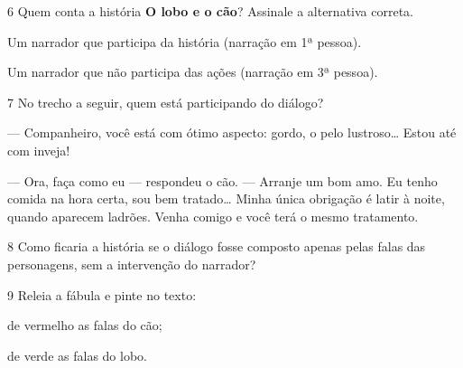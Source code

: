 \begin{conteudo}
\begin{conteudo}
\begin{conteudo}
\begin{conteudo}

\pagebreak
\num{6} Quem conta a história \textbf{O lobo e o cão}? Assinale a alternativa correta.

\begin{boxlist}
 Um narrador que participa da história (narração em 1ª pessoa).

 Um narrador que não participa das ações (narração em 3ª pessoa).
\end{boxlist}

\num{7} No trecho a seguir, quem está participando do diálogo?

\begin{conteudo}{
--- Companheiro, você está com ótimo aspecto: gordo, o pelo
lustroso\ldots{} Estou até com inveja!

--- Ora, faça como eu --- respondeu o cão. --- Arranje um bom amo. Eu
tenho comida na hora certa, sou bem tratado\ldots{} Minha única
obrigação é latir à noite, quando aparecem ladrões. Venha comigo e você
terá o mesmo tratamento.
}


\num{8} Como ficaria a história se o diálogo fosse composto apenas pelas falas
das personagens, sem a intervenção do narrador?




\num{9} Releia a fábula e pinte no texto:

\begin{escolha}
\item de vermelho as falas do cão;

\item de verde as falas do lobo.
\end{escolha}


\end{conteudo}
\end{conteudo}
\end{conteudo}
\end{conteudo}
\end{conteudo}
